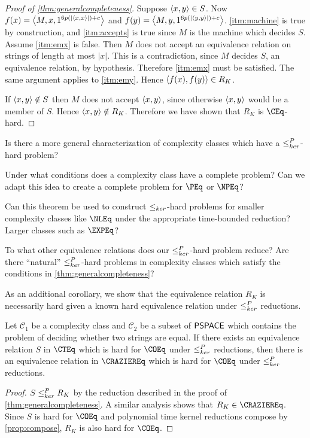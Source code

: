 \begin{proof}[Proof of \autoref{thm:generalcompleteness}]
  Suppose $\left\langle x,y\right\rangle\in S$.
  Now $f(x)=\left\langle M,x,1^{6p(|\left\langle x,x\right\rangle|)+c}\right\rangle$ and $f(y)=\left\langle M,y,1^{6p(|\left\langle y,y\right\rangle|)+c}\right\rangle$.
  \autoref{itm:machine} is true by construction, and \autoref{itm:accepts} is true since $M$ is the machine which decides $S$.
  Assume \autoref{itm:emx} is false.
  Then $M$ does not accept an equivalence relation on strings of length at most $|x|$.
  This is a contradiction, since $M$ decides $S$, an equivalence relation, by hypothesis.
  Therefore \autoref{itm:emx} must be satisfied.
  The same argument applies to \autoref{itm:emy}.
  Hence $\left\langle f(x),f(y)\right\rangle\in R_K$.

  If $\left\langle x,y\right\rangle\notin S$ then $M$ does not accept $\left\langle x,y\right\rangle$, since otherwise $\left\langle x,y\right\rangle$ would be a member of $S$.
  Hence $\left\langle x,y\right\rangle\notin R_K$.
  Therefore we have shown that $R_K$ is $\CEq$-hard.
\end{proof}

\begin{openproblem}
  Is there a more general characterization of complexity classes which have a $\leq^{P}_{ker}$-hard problem?
\end{openproblem}

\begin{openproblem}
  Under what conditions does a complexity class have a complete problem?
  Can we adapt this idea to create a complete problem for $\PEq$ or $\NPEq$?
\end{openproblem}

\begin{openproblem}
  Can this theorem be used to construct $\leq_{ker}$-hard problems for smaller complexity classes like $\NLEq$ under the appropriate time-bounded reduction?
  Larger classes such as $\EXPEq$?
\end{openproblem}

\begin{openproblem}
  To what other equivalence relations does our $\leq^{P}_{ker}$-hard problem reduce?
  Are there ``natural'' $\leq^{P}_{ker}$-hard problems in complexity classes which satisfy the conditions in \autoref{thm:generalcompleteness}?
\end{openproblem}

As an additional corollary, we show that the equivalence relation $R_K$ is necessarily hard given a known hard equivalence relation under $\leq^{P}_{ker}$ reductions.

\begin{corollary}
  Let $\mathcal{C}_1$ be a complexity class and $\mathcal{C}_2$ be a subset of ${\mathsf{PSPACE}}$ which contains the problem of deciding whether two strings are equal.
  If there exists an equivalence relation $S$ in $\CTEq$ which is hard for $\COEq$ under $\leq^{P}_{ker}$ reductions, then there is an equivalence relation in $\CRAZIEREq$ which is hard for $\COEq$ under $\leq^{P}_{ker}$ reductions.
\end{corollary}
\begin{proof}
  $S\leq^{P}_{ker} R_K$ by the reduction described in the proof of \autoref{thm:generalcompleteness}.
  A similar analysis shows that $R_K\in\CRAZIEREq$.
  Since $S$ is hard for $\COEq$ and polynomial time kernel reductions compose by \autoref{prop:compose}, $R_K$ is also hard for $\COEq$.
\end{proof}

